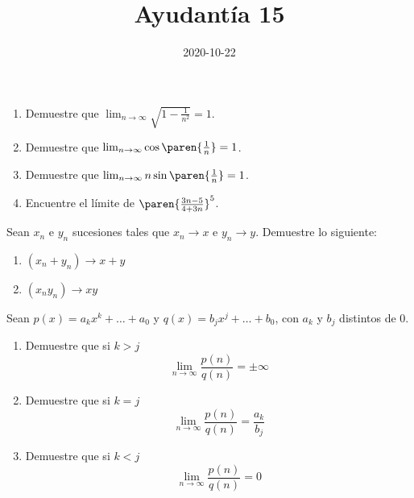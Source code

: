 \documentclass{ayudantia}
\title{Ayudantía 15}
\date{2020-10-22}
\begin{document}
\maketitle


\begin{prob}
    \begin{enumerate}[label=(\alph*)]
        \item Demuestre que \(\lim_{n\rightarrow\infty}\sqrt{1-\frac1{n^2}}=1\).
        \item Demuestre que \(\lim_{n\rightarrow\infty}\cos\paren{\frac1n}=1\).
        \item Demuestre que \(\lim_{n\rightarrow\infty}n\sin\paren{\frac1n}=1\).
        \item Encuentre el límite de \(\paren{\frac{3n-5}{4+3n}}^5\).
    \end{enumerate}
\end{prob}

\begin{ans}
    \begin{sol}

    \end{sol}
\end{ans}


\begin{prob}
    Sean \(x_n\) e \(y_n\) sucesiones tales que \(x_n\rightarrow x\) e \(y_n\rightarrow y\). Demuestre lo siguiente:
    \begin{enumerate}[label=(\alph*)]
        \item \((x_n+y_n)\rightarrow x+y\)
        \item \((x_ny_n)\rightarrow xy\)
    \end{enumerate}
\end{prob}

\begin{ans}
    \begin{sol}

    \end{sol}
\end{ans}


\begin{prob}
    Sean \(p(x)=a_kx^k+\ldots+a_0\) y \(q(x)=b_jx^j+\ldots+b_0\), con \(a_k\) y \(b_j\) distintos de \(0\).
    \begin{enumerate}
        \item Demuestre que si \(k>j\)
        \begin{equation*}
            \lim_{n\rightarrow\infty}\frac{p(n)}{q(n)}=\pm\infty
        \end{equation*}
        \item Demuestre que si \(k=j\)
        \begin{equation*}
            \lim_{n\rightarrow\infty}\frac{p(n)}{q(n)}=\frac{a_k}{b_j}
        \end{equation*}
        \item Demuestre que si \(k<j\)
        \begin{equation*}
            \lim_{n\rightarrow\infty}\frac{p(n)}{q(n)}=0
        \end{equation*}
    \end{enumerate}
\end{prob}

\begin{ans}
    \begin{sol}

    \end{sol}
\end{ans}
\end{document}
